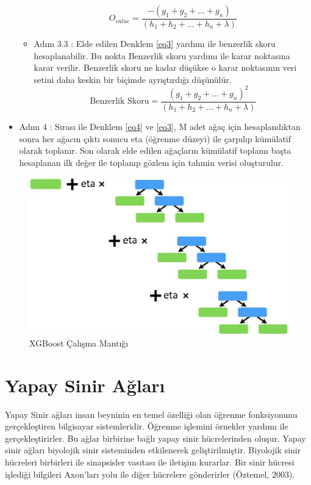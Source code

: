 \documentclass[12pt,twoside]{deuthesis}
\begin{document}
\begin{itemize}
\begin{itemize}
\[      \]
    \begin{equation}
      O_{value} = \frac{-(g_1 + g_2 + \ldots + g_n)}{(h_1 + h_2 + \ldots + h_n + \lambda)}
      \label{eq3}
      \end{equation}
  \item
    Adım 3.3 : Elde edilen Denklem \ref{eq3} yardımı ile benzerlik skoru hesaplanabilir. Bu nokta Benzerlik skoru yardımı ile karar noktasına karar verilir. Benzerlik skoru ne kadar düşükse o karar noktasının veri setini daha keskin bir biçimde ayrıştırdığı düşünülür.
    \begin{equation}
      \label{eq4}
      \textrm{Benzerlik Skoru} = \frac{(g_1 + g_2 + \ldots + g_n)^2}{(h_1 + h_2 + \ldots + h_n + \lambda)}
      \end{equation}
  \end{itemize}
\item
  Adım 4 : Sırası ile Denklem \ref{eq4} ve \ref{eq3}, M adet ağaç için hesaplandıktan sonra her ağacın çıktı sonucu eta (öğrenme düzeyi) ile çarpılıp kümülatif olarak toplanır. Son olarak elde edilen ağaçların kümülatif toplamı başta hesaplanan ilk değer ile toplanıp gözlem için tahmin verisi oluşturulur.
\end{itemize}
\begin{figure}

{\centering \includegraphics[width=0.8\linewidth,height=0.3\textheight]{figure/xgb} 

}

\caption{XGBoost Çalışma Mantığı}\label{fig:unnamed-chunk-9}
\end{figure}
\hypertarget{nn}{%
\section{Yapay Sinir Ağları}\label{nn}}

Yapay Sinir ağları insan beyninin en temel özelliği olan öğrenme fonksiyonunu gerçekleştiren bilgisayar sistemleridir. Öğrenme işlemini örnekler yardımı ile gerçekleştirirler. Bu ağlar birbirine bağlı yapay sinir hücrelerinden oluşur. Yapay sinir ağları biyolojik sinir sisteminden etkilenerek geliştirilmiştir. Biyolojik sinir hücreleri birbirleri ile sinapsisler vasıtası ile iletişim kurarlar. Bir sinir hücresi işlediği bilgileri Axon'ları yolu ile diğer hücrelere gönderirler (Öztemel, 2003).\\
\end{document}
